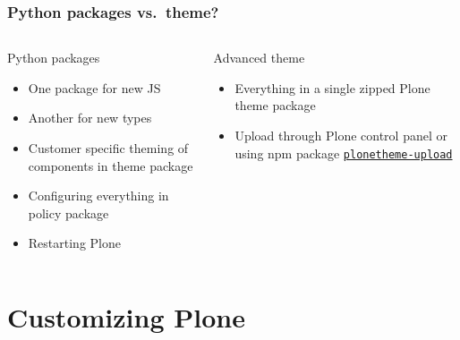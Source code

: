 \documentclass[aspectratio=43]{beamer}
\begin{document}
\begin{frame}[plain,t]
  \frametitle{Python packages vs.\ theme?}
  \begin{columns}[onlytextwidth,t]
  \begin{column}{0.45\textwidth}
  Python packages
  \vspace{1em}
  \begin{itemize}[<+->]
  \setlength{\itemsep}{1em}
  \item One package for new JS
  \item Another for new types
  \item Customer specific theming of components in theme package
  \item Configuring everything in policy package
  \item Restarting Plone
  \end{itemize}
  \end{column}
  \begin{column}{0.45\textwidth}
  Advanced theme
  \vspace{1em}
  \begin{itemize}[<+->]
  \setlength{\itemsep}{1em}
  \item Everything in a single zipped Plone theme package
  \item Upload through Plone control panel or using npm package
  \href{https://www.npmjs.com/package/plonetheme-upload}{\texttt{plonetheme-upload}}
  \end{itemize}
  \end{column}
  \end{columns}
\end{frame}

\section{Customizing Plone}
\end{document}
